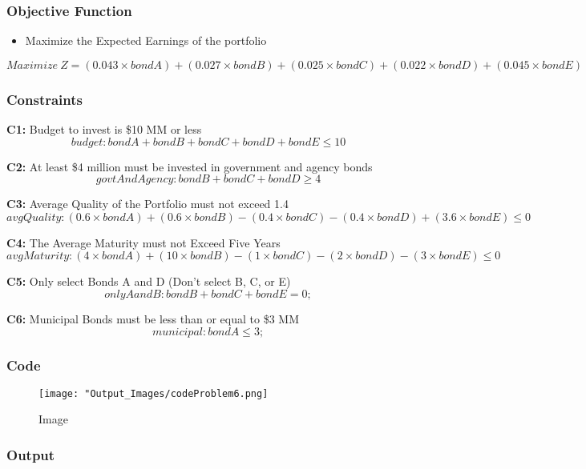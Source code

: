 \documentclass[
  12pt,
]{article}
\providecommand{\tightlist}{%
  \setlength{\itemsep}{0pt}\setlength{\parskip}{0pt}}
\begin{document}
\hypertarget{objective-function-3}{%
\subsubsection{Objective Function}\label{objective-function-3}}

\begin{itemize}
\tightlist
\item
  Maximize the Expected Earnings of the portfolio
\end{itemize}

\[
Maximize \ Z = (0.043 \times bondA) + (0.027 \times bondB) + (0.025 \times bondC) + (0.022 \times bondD) + (0.045 \times bondE)
\]

\hypertarget{constraints-2}{%
\subsubsection{Constraints}\label{constraints-2}}

\textbf{C1:} Budget to invest is \$10 MM or less \[
budget: bondA + bondB + bondC + bondD + bondE \leq 10
\]

\textbf{C2:} At least \$4 million must be invested in government and
agency bonds \[
govtAndAgency: bondB + bondC + bondD \geq 4
\]

\textbf{C3:} Average Quality of the Portfolio must not exceed 1.4 \[
avgQuality: (0.6 \times bondA) + (0.6 \times bondB) - (0.4 \times bondC) 
- (0.4 \times bondD) + (3.6 \times bondE) \leq 0
\]

\textbf{C4:} The Average Maturity must not Exceed Five Years \[
avgMaturity: (4 \times bondA) + (10 \times bondB) - (1 \times bondC) 
- (2 \times bondD) - (3 \times bondE) \leq 0
\]

\textbf{C5:} Only select Bonds A and D (Don't select B, C, or E) \[
onlyAandB: bondB + bondC + bondE = 0;
\]

\textbf{C6:} Municipal Bonds must be less than or equal to \$3 MM \[
municipal: bondA \leq 3;
\]

\hypertarget{code-8}{%
\subsubsection{Code}\label{code-8}}

\begin{figure}
\centering
\texttt{[image: "Output\_Images/codeProblem6.png]}
\caption{Image}
\end{figure}

\hypertarget{output-9}{%
\subsubsection{Output}\label{output-9}}
\end{document}
